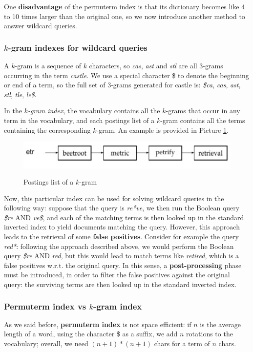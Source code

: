 One \textbf{disadvantage} of the permuterm index is that its dictionary becomes like 4 to 10 times larger than the original one, so we now introduce another method to answer wildcard queries.

\subsubsection{$k$-gram indexes for wildcard queries}
A $k$-gram is a sequence of $k$ characters, so \textit{cas}, \textit{ast} and \textit{stl} are all 3-grams occurring in the term \textit{castle}. We use a special character \$ to denote the beginning or end of a term, so the full set of 3-grams generated for castle is: \textit{\$ca}, \textit{cas}, \textit{ast}, \textit{stl}, \textit{tle}, \textit{le\$}. 

In the \textit{$k$-gram index}, the vocabulary contains all the $k$-grams that occur in any term in the vocabulary, and each postings list of a $k$-gram contains all the terms containing the corresponding $k$-gram. An example is provided in Picture \ref{kgram}.

\begin{figure}[h!]
		\centering
		\includegraphics[scale = 1.6]{img/k-grams .jpg}
		\label{kgram}
        \caption{Postings list of a $k$-gram}
\end{figure}

Now, this particular index can be used for solving wildcard queries in the following way: suppose that the query is \textit{re*ve}, we then run the Boolean query \textit{\$re} AND \textit{ve\$}, and each of the matching terms is then looked up in the standard inverted index to yield documents matching the query. However, this approach leads to the retrieval of some \textbf{false positives}. Consider for example the query \textit{red*}: following the approach described above, we would perform the Boolean query \textit{\$re} AND \textit{red}, but this would lead to match terms like \textit{retired}, which is a false positives w.r.t. the original query. In this sense, a \textbf{post-processing} phase must be introduced, in order to filter the false positives against the original query: the surviving terms are then looked up in the standard inverted index.

\subsubsection{Permuterm index vs $k$-gram index}
As we said before, \textbf{permuterm index} is not space efficient: if $n$ is the average length of a word, using the character \$ as a suffix, we add $n$ rotations to the vocabulary; overall, we need $(n+1) * (n+1)$ chars for a term of $n$ chars.

